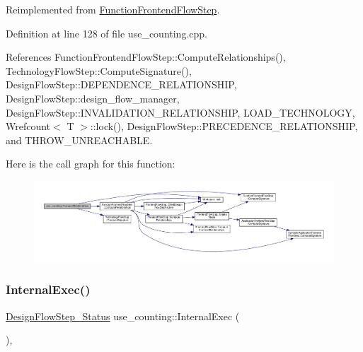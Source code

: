 Reimplemented from \hyperlink{classFunctionFrontendFlowStep_a1a815ea7885f3e92e414dadd40c43cba}{Function\+Frontend\+Flow\+Step}.



Definition at line 128 of file use\+\_\+counting.\+cpp.



References Function\+Frontend\+Flow\+Step\+::\+Compute\+Relationships(), Technology\+Flow\+Step\+::\+Compute\+Signature(), Design\+Flow\+Step\+::\+D\+E\+P\+E\+N\+D\+E\+N\+C\+E\+\_\+\+R\+E\+L\+A\+T\+I\+O\+N\+S\+H\+IP, Design\+Flow\+Step\+::design\+\_\+flow\+\_\+manager, Design\+Flow\+Step\+::\+I\+N\+V\+A\+L\+I\+D\+A\+T\+I\+O\+N\+\_\+\+R\+E\+L\+A\+T\+I\+O\+N\+S\+H\+IP, L\+O\+A\+D\+\_\+\+T\+E\+C\+H\+N\+O\+L\+O\+GY, Wrefcount$<$ T $>$\+::lock(), Design\+Flow\+Step\+::\+P\+R\+E\+C\+E\+D\+E\+N\+C\+E\+\_\+\+R\+E\+L\+A\+T\+I\+O\+N\+S\+H\+IP, and T\+H\+R\+O\+W\+\_\+\+U\+N\+R\+E\+A\+C\+H\+A\+B\+LE.

Here is the call graph for this function\+:
\nopagebreak
\begin{figure}[H]
\begin{center}
\leavevmode
\includegraphics[width=350pt]{d4/d2e/classuse__counting_ae50eb0e5cc8c9e0a5c6a630ac6765f59_cgraph}
\end{center}
\end{figure}
\mbox{\label{classuse__counting_ae475b6f0db3a817a4a1b90ba6ffb2a6d}} 
\subsubsection{\texorpdfstring{Internal\+Exec()}{InternalExec()}}
{\footnotesize\ttfamily \hyperlink{design__flow__step_8hpp_afb1f0d73069c26076b8d31dbc8ebecdf}{Design\+Flow\+Step\+\_\+\+Status} use\+\_\+counting\+::\+Internal\+Exec (\begin{DoxyParamCaption}{ }\end{DoxyParamCaption})\hspace{0.3cm}{\ttfamily [override]}, {\ttfamily [virtual]}}



